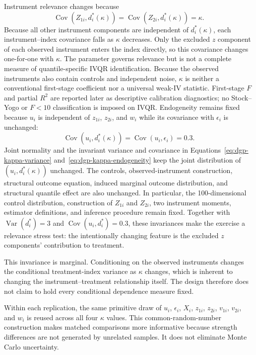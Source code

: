 Instrument relevance changes because
\begin{equation}
  \operatorname{Cov}\!\left(Z_{1i},d_i^*(\kappa)\right)
  =\operatorname{Cov}\!\left(Z_{2i},d_i^*(\kappa)\right)
  =\kappa.
  \label{eq:dgp-kappa-relevance}
\end{equation}
Because all other instrument components are independent of $d_i^*(\kappa)$, each instrument--index covariance falls as $\kappa$ decreases. Only the excluded $z$ component of each observed instrument enters the index directly, so this covariance changes one-for-one with $\kappa$. The parameter governs relevance but is not a complete measure of quantile-specific IVQR identification. Because the observed instruments also contain controls and independent noise, $\kappa$ is neither a conventional first-stage coefficient nor a universal weak-IV statistic. First-stage $F$ and partial $R^2$ are reported later as descriptive calibration diagnostics; no Stock--Yogo or $F<10$ classification is imposed on IVQR. Endogeneity remains fixed because $u_i$ is independent of $z_{1i}$, $z_{2i}$, and $w_i$ while its covariance with $\epsilon_i$ is unchanged:
\begin{equation}
  \operatorname{Cov}\!\left(u_i,d_i^*(\kappa)\right)
  =\operatorname{Cov}(u_i,\epsilon_i)=0.3.
  \label{eq:dgp-kappa-endogeneity}
\end{equation}
Joint normality and the invariant variance and covariance in Equations~\eqref{eq:dgp-kappa-variance} and~\eqref{eq:dgp-kappa-endogeneity} keep the joint distribution of $(u_i,d_i^*(\kappa))$ unchanged. The controls, observed-instrument construction, structural outcome equation, induced marginal outcome distribution, and structural quantile effect are also unchanged. In particular, the 100-dimensional control distribution, construction of $Z_{1i}$ and $Z_{2i}$, two instrument moments, estimator definitions, and inference procedure remain fixed. Together with $\operatorname{Var}(d_i^*)=3$ and $\operatorname{Cov}(u_i,d_i^*)=0.3$, these invariances make the exercise a relevance stress test: the intentionally changing feature is the excluded $z$ components' contribution to treatment.

This invariance is marginal. Conditioning on the observed instruments changes the conditional treatment-index variance as $\kappa$ changes, which is inherent to changing the instrument--treatment relationship itself. The design therefore does not claim to hold every conditional dependence measure fixed.

Within each replication, the same primitive draw of $u_i$, $\epsilon_i$, $X_i$, $z_{1i}$, $z_{2i}$, $v_{1i}$, $v_{2i}$, and $w_i$ is reused across all four $\kappa$ values. This common-random-number construction makes matched comparisons more informative because strength differences are not generated by unrelated samples. It does not eliminate Monte Carlo uncertainty.

